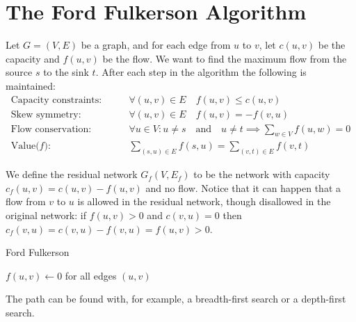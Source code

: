 \documentclass[12pt]{article}
\begin{document}
\section*{The Ford Fulkerson Algorithm}
Let $G = (V,E)$ be a graph, and for each edge from $u$ to $v$, let $c(u,v)$
be the capacity and $f(u,v)$ be the flow. We want to find the maximum
flow from the source $s$ to the sink $t$. After each step in the algorithm
the following is maintained:
\begin{align*}
  \text{Capacity constraints:}\qquad & \forall(u,v) \in E \quad f(u,v)
  \le c(u,v) \\
  \text{Skew symmetry:}\qquad & \forall(u,v) \in E \quad f(u,v) = -f(v,u) \\
  \text{Flow conservation:}\qquad & \forall u \in V : u \ne s
  \quad \text{and}\quad
  u \ne t \implies \sum_{w \in V} f(u,w) = 0 \\
  \text{Value($f$):}\qquad & \sum_{(s,u)\in E}f(s,u) = \sum_{(v,t)\in E}f(v,t)
\end{align*}

We define the residual network $G_f(V,E_f)$ to be the network with
capacity $c_f(u,v) = c(u,v) - f(u,v)$ and no flow. Notice that it can happen
that a flow from $v$ to $u$ is allowed in the residual network, though
disallowed in the original network: if $f(u,v) > 0$
and $c(v,u) = 0$ then $c_f(v,u) = c(v,u) - f(v,u) = f(u,v) > 0$.\\

\begin{algorithm}[H]
 \caption{Ford Fulkerson}
 $f(u,v) \gets 0$ for all edges $(u,v)$ \\
\end{algorithm}
\vspace{.5cm}
The path can be found with, for example, a breadth-first search or a depth-first search.

\end{document}
